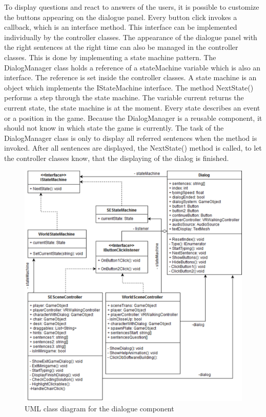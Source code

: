 To display questions and react to answers of the users, it is possible to customize the buttons appearing on the dialogue panel. Every button click invokes a callback, which is an interface method. This interface can be implemented individually by the controller classes. The appearance of the dialogue panel with the right sentences at the right time can also be managed in the controller classes. This is done by implementing a state machine pattern. The DialogManager class holds a reference of a stateMachine variable which is also an interface. The reference is set inside the controller classes. A state machine is an object which implements the IStateMachine interface. The method NextState() performs a step through the state machine. The variable current returns the current state, the state machine is at the moment. Every state describes an event or a position in the game. Because the DialogManager is a reusable component, it should not know in which state the game is currently. The task of the DialogManager class is only to display all referred sentences when the method is invoked. After all sentences are displayed, the NextState() method is called, to let the controller classes know, that the displaying of the dialog is finished. 
\begin{figure}[h!]
  \includegraphics[width=13cm]{kapitel/eps/uml-dialog.pdf}
  \centering
  \caption{UML class diagram for the dialogue component}
  \label{fig:uml-universalinput}
\end{figure}
